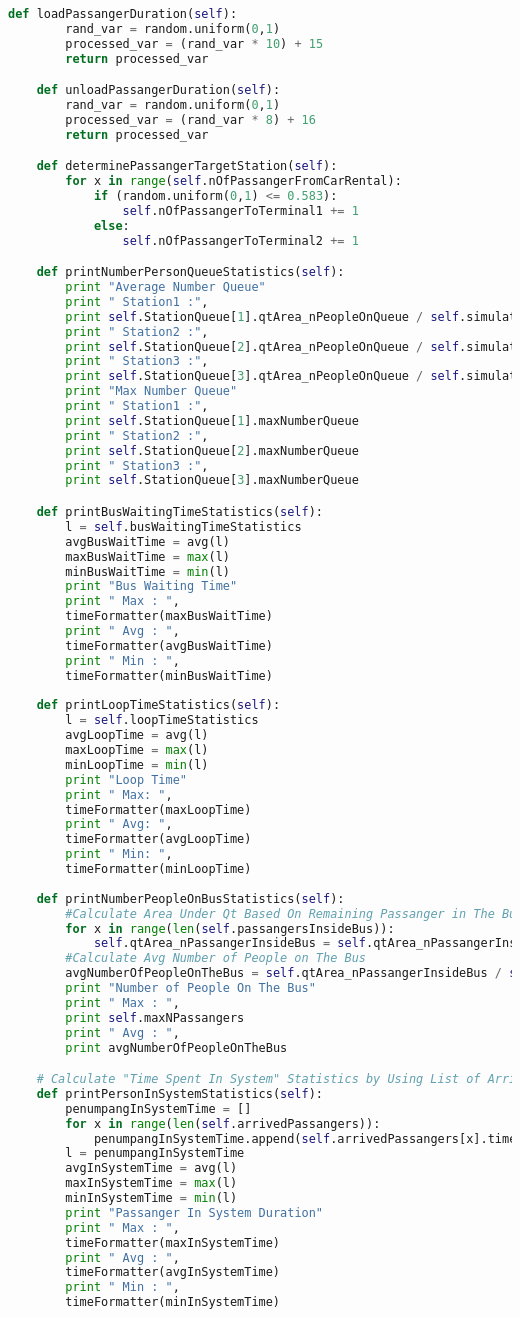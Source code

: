 \documentclass{article}
\begin{document}
\begin{lstlisting}[language=Python]
	def loadPassangerDuration(self):
		rand_var = random.uniform(0,1)
		processed_var = (rand_var * 10) + 15
		return processed_var

	def unloadPassangerDuration(self):
		rand_var = random.uniform(0,1)
		processed_var = (rand_var * 8) + 16
		return processed_var

	def determinePassangerTargetStation(self):
		for x in range(self.nOfPassangerFromCarRental):
			if (random.uniform(0,1) <= 0.583):
				self.nOfPassangerToTerminal1 += 1
			else:
				self.nOfPassangerToTerminal2 += 1

	def printNumberPersonQueueStatistics(self):
		print "Average Number Queue"
		print "	Station1 :",
		print self.StationQueue[1].qtArea_nPeopleOnQueue / self.simulationTime
		print "	Station2 :",
		print self.StationQueue[2].qtArea_nPeopleOnQueue / self.simulationTime
		print "	Station3 :",
		print self.StationQueue[3].qtArea_nPeopleOnQueue / self.simulationTime
		print "Max Number Queue"
		print "	Station1 :",
		print self.StationQueue[1].maxNumberQueue 
		print "	Station2 :",
		print self.StationQueue[2].maxNumberQueue 
		print "	Station3 :",
		print self.StationQueue[3].maxNumberQueue 

	def printBusWaitingTimeStatistics(self):
		l = self.busWaitingTimeStatistics
		avgBusWaitTime = avg(l)
		maxBusWaitTime = max(l)
		minBusWaitTime = min(l)
		print "Bus Waiting Time"
		print "	Max : ",
		timeFormatter(maxBusWaitTime)
		print "	Avg : ",
		timeFormatter(avgBusWaitTime)		
		print "	Min : ",
		timeFormatter(minBusWaitTime)
	
	def printLoopTimeStatistics(self):
		l = self.loopTimeStatistics
		avgLoopTime = avg(l)
		maxLoopTime = max(l)
		minLoopTime = min(l)
		print "Loop Time"
		print "	Max: ",
		timeFormatter(maxLoopTime)
		print "	Avg: ",
		timeFormatter(avgLoopTime)			
		print "	Min: ",
		timeFormatter(minLoopTime)
		
	def printNumberPeopleOnBusStatistics(self):
		#Calculate Area Under Qt Based On Remaining Passanger in The Bus
		for x in range(len(self.passangersInsideBus)):
			self.qtArea_nPassangerInsideBus = self.qtArea_nPassangerInsideBus + (self.simulationTime - self.passangersInsideBus[x].timeEnteringTheBus)
		#Calculate Avg Number of People on The Bus
		avgNumberOfPeopleOnTheBus = self.qtArea_nPassangerInsideBus / self.simulationTime
		print "Number of People On The Bus"
		print "	Max : ",
		print self.maxNPassangers
		print "	Avg : ",
		print avgNumberOfPeopleOnTheBus	

	# Calculate "Time Spent In System" Statistics by Using List of Arrived Passanger
	def printPersonInSystemStatistics(self):
		penumpangInSystemTime = []
		for x in range(len(self.arrivedPassangers)):
			penumpangInSystemTime.append(self.arrivedPassangers[x].timeLeavingTheBus - self.arrivedPassangers[x].arrivedTimeAtOriginStation)
		l = penumpangInSystemTime
		avgInSystemTime = avg(l)
		maxInSystemTime = max(l)
		minInSystemTime = min(l)
		print "Passanger In System Duration"
		print "	Max : ",
		timeFormatter(maxInSystemTime)
		print "	Avg : ",
		timeFormatter(avgInSystemTime)
		print "	Min : ",
		timeFormatter(minInSystemTime)


\end{lstlisting}
\end{document}
